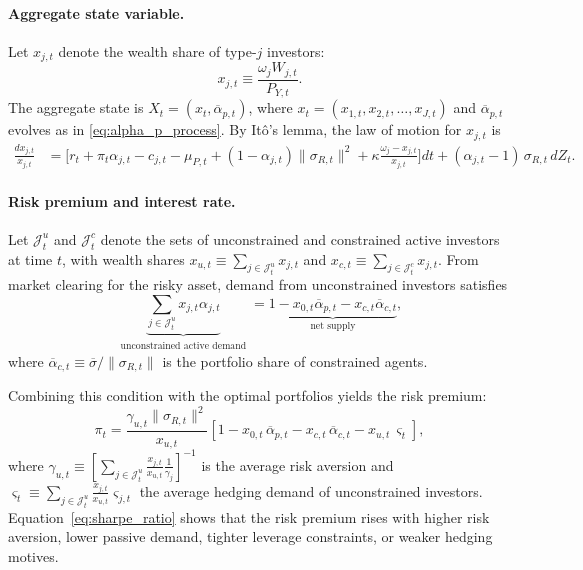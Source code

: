 \documentclass[12pt,english]{article}
\begin{document}
\paragraph{Aggregate state variable.} 

Let $x_{j,t}$ denote the wealth share of type-$j$ investors:
\begin{equation}\nonumber
    x_{j,t} \equiv \frac{\omega_j W_{j,t}}{P_{Y,t}}.
\end{equation}
The aggregate state is $X_t = (x_t, \overline{\alpha}_{p,t})$, where $x_t = (x_{1,t}, x_{2,t}, \ldots, x_{J,t})$ and $\overline{\alpha}_{p,t}$ evolves as in \eqref{eq:alpha_p_process}. By It\^{o}'s lemma, the law of motion for $x_{j,t}$ is
\begin{align*}
    \frac{dx_{j,t}}{x_{j,t}} 
    &= \Big[ r_t + \pi_t \alpha_{j,t} - c_{j,t} - \mu_{P,t} 
        + (1-\alpha_{j,t}) \|\sigma_{R,t}\|^2 
        + \kappa \frac{\omega_j - x_{j,t}}{x_{j,t}} \Big] dt  + (\alpha_{j,t} - 1)\, \sigma_{R,t}\, dZ_t.
\end{align*}


\paragraph{Risk premium and interest rate.} 

Let $\mathcal{J}_t^u$ and $\mathcal{J}_t^c$ denote the sets of unconstrained and constrained active investors at time $t$, with wealth shares $x_{u,t} \equiv \sum_{j\in \mathcal{J}_t^u} x_{j,t}$ and $x_{c,t} \equiv \sum_{j\in \mathcal{J}_t^c} x_{j,t}$. From market clearing for the risky asset, demand from unconstrained investors satisfies
\begin{equation}\label{eq:mkt-clearing}
    \underbrace{\sum_{j \in \mathcal{J}_t^u} x_{j,t} \alpha_{j,t} }_{\substack{\text{unconstrained active demand}}} = \underbrace{1 - x_{0,t} \overline{\alpha}_{p,t} - x_{c,t} \overline{\alpha}_{c,t} }_{\text{net supply}},
\end{equation}
where $\overline{\alpha}_{c,t} \equiv \overline{\sigma}/\|\sigma_{R,t}\|$ is the portfolio share of constrained agents.

Combining this condition with the optimal portfolios yields the risk premium:
\begin{equation}\label{eq:sharpe_ratio}
    \pi_t = \frac{\gamma_{u,t} \|\sigma_{R,t}\|^2}{x_{u,t}}
    \left[ 1 - x_{0,t}\, \overline{\alpha}_{p,t} 
    - x_{c,t}\, \overline{\alpha}_{c,t} 
    - x_{u,t}\, \varsigma_t \right],
\end{equation}
where $\gamma_{u,t} \equiv [\sum_{j\in\mathcal{J}_t^u} \frac{x_{j,t}}{x_{u,t}} \frac{1}{\gamma_j}]^{-1}$ is the average risk aversion and $\varsigma_t \equiv \sum_{j\in \mathcal{J}_t^u} \frac{x_{j,t}}{x_{u,t}} \varsigma_{j,t}$ the average hedging demand of unconstrained investors.  
Equation~\eqref{eq:sharpe_ratio} shows that the risk premium rises with higher risk aversion, lower passive demand, tighter leverage constraints, or weaker hedging motives.
\end{document}
